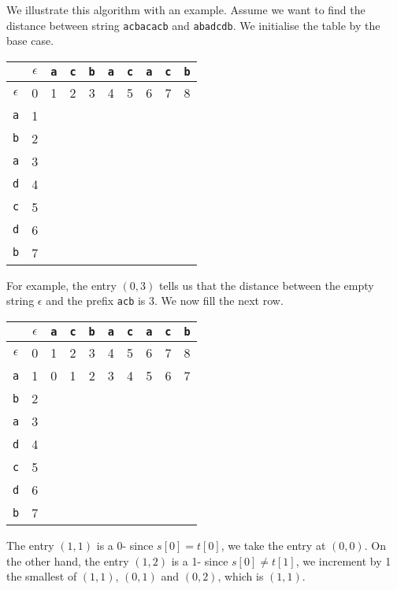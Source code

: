 \documentclass[a4paper, openany]{memoir}
\begin{document}
We illustrate this algorithm with an example. Assume we want to find the distance between string \texttt{acbacacb} and \texttt{abadcdb}. We initialise the table by the base case.
\begin{table}[H]
    \centering
    \begin{tabular}{|c|c|c|c|c|c|c|c|c|c|}
        \hline
         & $\epsilon$ & \texttt{a} & \texttt{c} & \texttt{b} & \texttt{a} & \texttt{c} & \texttt{a} & \texttt{c} & \texttt{b} \\
        \hline
        $\epsilon$ & 0 & 1 & 2 & 3 & 4 & 5 & 6 & 7 & 8 \\
        \hline
        \texttt{a} & 1 & & & & & & & & \\
        \hline
        \texttt{b} & 2 & & & & & & & & \\
        \hline
        \texttt{a} & 3 & & & & & & & & \\
        \hline
        \texttt{d} & 4 & & & & & & & & \\
        \hline
        \texttt{c} & 5 & & & & & & & & \\
        \hline
        \texttt{d} & 6 & & & & & & & & \\
        \hline
        \texttt{b} & 7 & & & & & & & & \\
        \hline
    \end{tabular}
\end{table}
\noindent For example, the entry $(0, 3)$ tells us that the distance between the empty string $\epsilon$ and the prefix \texttt{acb} is 3. We now fill the next row.
\begin{table}[H]
    \centering
    \begin{tabular}{|c|c|c|c|c|c|c|c|c|c|}
        \hline
        & $\epsilon$ & \texttt{a} & \texttt{c} & \texttt{b} & \texttt{a} & \texttt{c} & \texttt{a} & \texttt{c} & \texttt{b} \\
        \hline
        $\epsilon$ & 0 & 1 & 2 & 3 & 4 & 5 & 6 & 7 & 8 \\
        \hline
        \texttt{a} & 1 & {\color{brown} 0} & {\color{red} 1} & 2 & 3 & 4 & 5 & 6 & 7 \\
        \hline
        \texttt{b} & 2 & & & & & & & & \\
        \hline
        \texttt{a} & 3 & & & & & & & & \\
        \hline
        \texttt{d} & 4 & & & & & & & & \\
        \hline
        \texttt{c} & 5 & & & & & & & & \\
        \hline
        \texttt{d} & 6 & & & & & & & & \\
        \hline
        \texttt{b} & 7 & & & & & & & & \\
        \hline
    \end{tabular}
\end{table}
\noindent The entry $(1, 1)$ is a 0- since $s[0] = t[0]$, we take the entry at $(0, 0)$. On the other hand, the entry $(1, 2)$ is a 1- since $s[0] \neq t[1]$, we increment by 1 the smallest of $(1, 1)$, $(0, 1)$ and $(0, 2)$, which is $(1, 1)$. 
\pagebreak
\end{document}
